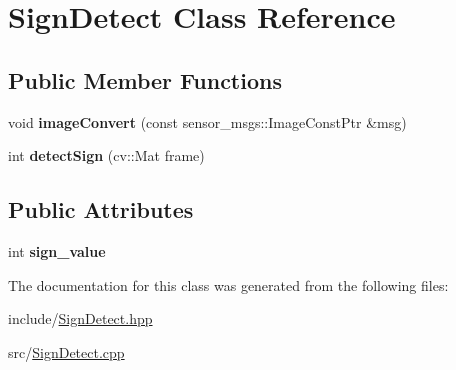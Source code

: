 \hypertarget{class_sign_detect}{}\section{Sign\+Detect Class Reference}
\label{class_sign_detect}
\subsection*{Public Member Functions}
\begin{DoxyCompactItemize}
\item 
\mbox{\label{class_sign_detect_a799bb6b19d16b36d92013a026c2ce459}} 
void {\bfseries image\+Convert} (const sensor\+\_\+msgs\+::\+Image\+Const\+Ptr \&msg)
\item 
\mbox{\label{class_sign_detect_a5ec5a9f921e729a592720a022f6ab491}} 
int {\bfseries detect\+Sign} (cv\+::\+Mat frame)
\end{DoxyCompactItemize}
\subsection*{Public Attributes}
\begin{DoxyCompactItemize}
\item 
\mbox{\label{class_sign_detect_abe35fa61ff6f71d71b062cd3bc379f95}} 
int {\bfseries sign\+\_\+value}
\end{DoxyCompactItemize}


The documentation for this class was generated from the following files\+:\begin{DoxyCompactItemize}
\item 
include/\mbox{\hyperlink{_sign_detect_8hpp}{Sign\+Detect.\+hpp}}\item 
src/\mbox{\hyperlink{_sign_detect_8cpp}{Sign\+Detect.\+cpp}}\end{DoxyCompactItemize}
